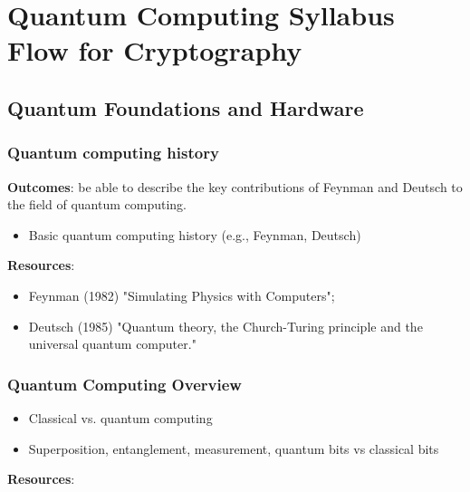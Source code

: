 \section{Quantum Computing Syllabus Flow for Cryptography}


\subsection{Quantum Foundations and Hardware}


\subsubsection{Quantum computing history}

\textbf{Outcomes}: be able to describe the key contributions of Feynman and Deutsch to the field of quantum computing.

\begin{itemize}
	\item Basic quantum computing history (e.g., Feynman, Deutsch)
\end{itemize}

\textbf{Resources}:

\begin{itemize}
	\item Feynman (1982) "Simulating Physics with Computers"; 

	\item Deutsch (1985) "Quantum theory, the Church-Turing principle and the universal quantum computer."
\end{itemize}


\subsubsection{Quantum Computing Overview}

\begin{itemize}
	\item Classical vs. quantum computing
	\item Superposition, entanglement, measurement, quantum bits vs classical bits
\end{itemize}
	

\textbf{Resources}:

